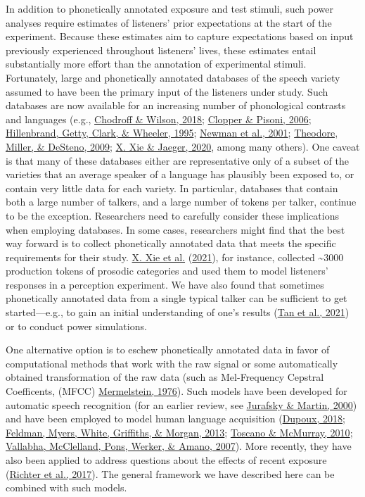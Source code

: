 \documentclass[
  11pt,
  english,
  man,floatsintext]{apa6}
\begin{document}
In addition to phonetically annotated exposure and test stimuli, such power analyses require estimates of listeners' prior expectations at the start of the experiment. Because these estimates aim to capture expectations based on input previously experienced throughout listeners' lives, these estimates entail substantially more effort than the annotation of experimental stimuli. Fortunately, large and phonetically annotated databases of the speech variety assumed to have been the primary input of the listeners under study. Such databases are now available for an increasing number of phonological contrasts and languages (e.g., \protect\hyperlink{ref-chodroff-wilson2018}{Chodroff \& Wilson, 2018}; \protect\hyperlink{ref-clopper-pisoni2006}{Clopper \& Pisoni, 2006}; \protect\hyperlink{ref-hillenbrand1995}{Hillenbrand, Getty, Clark, \& Wheeler, 1995}; \protect\hyperlink{ref-newman2001}{Newman et al., 2001}; \protect\hyperlink{ref-theodore2009}{Theodore, Miller, \& DeSteno, 2009}; \protect\hyperlink{ref-xie-jaeger2020}{X. Xie \& Jaeger, 2020}, among many others). One caveat is that many of these databases either are representative only of a subset of the varieties that an average speaker of a language has plausibly been exposed to, or contain very little data for each variety. In particular, databases that contain both a large number of talkers, and a large number of tokens per talker, continue to be the exception. Researchers need to carefully consider these implications when employing databases. In some cases, researchers might find that the best way forward is to collect phonetically annotated data that meets the specific requirements for their study. \protect\hyperlink{ref-xie2021cognition}{X. Xie et al.} (\protect\hyperlink{ref-xie2021cognition}{2021}), for instance, collected \textasciitilde3000 production tokens of prosodic categories and used them to model listeners' responses in a perception experiment. We have also found that sometimes phonetically annotated data from a single typical talker can be sufficient to get started---e.g., to gain an initial understanding of one's results (\protect\hyperlink{ref-tan2021}{Tan et al., 2021}) or to conduct power simulations.

One alternative option is to eschew phonetically annotated data in favor of computational methods that work with the raw signal or some automatically obtained transformation of the raw data (such as Mel-Frequency Cepstral Coefficents, (MFCC) \protect\hyperlink{ref-Mermelstein1976}{Mermelstein, 1976}). Such models have been developed for automatic speech recognition (for an earlier review, see \protect\hyperlink{ref-jurafsky-martin2000}{Jurafsky \& Martin, 2000}) and have been employed to model human language acquisition (\protect\hyperlink{ref-dupoux2018}{Dupoux, 2018}; \protect\hyperlink{ref-feldman2013}{Feldman, Myers, White, Griffiths, \& Morgan, 2013}; \protect\hyperlink{ref-toscano-mcmurray2010}{Toscano \& McMurray, 2010}; \protect\hyperlink{ref-vallabha2007}{Vallabha, McClelland, Pons, Werker, \& Amano, 2007}). More recently, they have also been applied to address questions about the effects of recent exposure (\protect\hyperlink{ref-richter2017}{Richter et al., 2017}). The general framework we have described here can be combined with such models.
\end{document}
